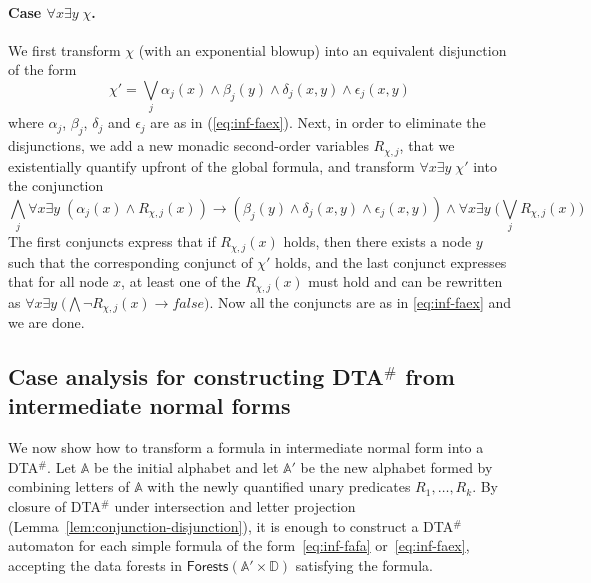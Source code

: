 \documentclass{CSML}
\newcommand\dad{\textup{DTA}$^\#$\xspace}
\newcommand\A{\ensuremath{\mathbb{A}}\xspace}
\newcommand\D{\mathbb{D}}
\newcommand\Forests{\mathsf{Forests}}
\begin{document}
\paragraph{\bf Case $\forall x \exists y\; \chi$.}
We first transform $\chi$ (with an exponential blowup) 
into an equivalent disjunction of the form
\[
\chi' = \bigvee_j \alpha_j(x) \wedge \beta_j(y) \wedge \delta_j(x,y) \wedge \epsilon_j(x,y)
\]
where $\alpha_j$, $\beta_j$, $\delta_j$ and $\epsilon_j$
are as in (\ref{eq:inf-faex}).
Next, in order to eliminate the disjunctions, we add a new
monadic second-order variables $R_{\chi, j}$, that we existentially quantify
upfront of the global formula, and transform $\forall x \exists
y\; \chi'$ into the conjunction
\[
\bigwedge_j
\forall x \exists y\; (\alpha_j(x) \wedge R_{\chi, j}(x)) \to (\beta_j(y) \wedge \delta_j(x,y) \wedge \epsilon_j(x,y))
\wedge
\forall x \exists y\; \bigl(\bigvee_j R_{\chi, j}(x)\bigr)
\]
The first conjuncts express that 
if $R_{\chi, j}(x)$ holds, then there exists a node $y$ 
such that the corresponding conjunct of $\chi'$ holds, 
and the last conjunct expresses that 
for all node $x$, at least one of the $R_{\chi, j}(x)$ must hold and can be
rewritten as $\forall x \exists y\; \bigl(\bigwedge \lnot R_{\chi, j}(x) \to
\mathit{false}\bigr)$. Now all the conjuncts are as in \eqref{eq:inf-faex} and
we are done.













\subsection{Case analysis for constructing \texorpdfstring{\dad}{DTA} from intermediate normal forms} We now show how to transform a formula in intermediate normal form into a \dad. 
Let \A be the initial alphabet and let $\A'$ be the new alphabet formed
by combining letters of \A with the newly quantified unary predicates $R_1,\ldots, R_k$.  
By closure of \dad under intersection and letter projection (Lemma~\ref{lem:conjunction-disjunction}), 
it is enough to construct a \dad automaton for each simple formula of the form~\eqref{eq:inf-fafa}
or~\eqref{eq:inf-faex}, accepting the data forests in $\Forests(\A'\times \D)$ satisfying the formula.
\end{document}
